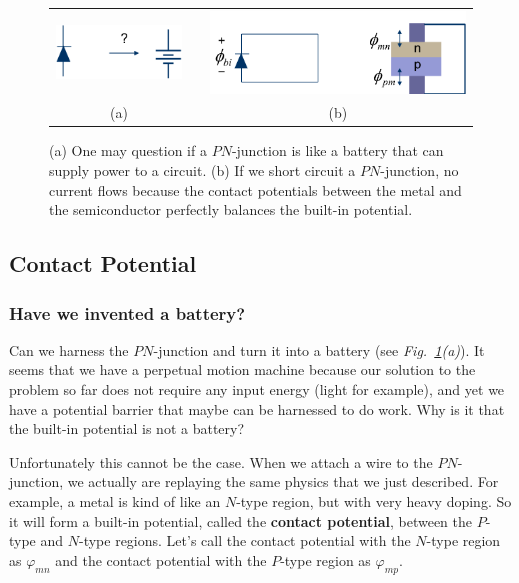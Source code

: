 \begin{figure}[t]
\centering
\begin{tabular}{ccc}
\includegraphics[width=.35\columnwidth]{slide25} & \hspace{.5cm} &
\includegraphics[width=.5\columnwidth]{slide26}\\
(a) &  & (b)\\
\end{tabular}
\caption{(a) One may question if a $PN$-junction is like a battery that can supply power to a circuit.  (b) If we short circuit a $PN$-junction, no current flows because the contact potentials between the metal and the semiconductor perfectly balances the built-in potential. }
\label{fig:slide25_26}
\end{figure}
\subsection{Contact Potential}
\subsubsection{Have we invented a battery?}
Can we harness the $PN$-junction and turn it into a battery \big(see \emph{Fig.~\ref{fig:slide25_26}(a)}\big).  It seems that we have a perpetual motion machine because our solution to the problem so far does not require any input energy (light for example), and yet we have a potential barrier that maybe can be harnessed to do work.  Why is it that the built-in potential is not a battery?

Unfortunately this cannot be the case.  When we attach a wire to the $PN$-junction, we actually are replaying the same physics that we just described.  For example, a metal is kind of like an $N$-type region, but with very heavy doping.  So it will form a built-in potential, called the \textbf{contact potential}, between the $P$-type and $N$-type regions.  Let's call the contact potential with the $N$-type region as $\varphi_{mn}$ and the contact potential with the $P$-type region as $\varphi_{mp}$.  

